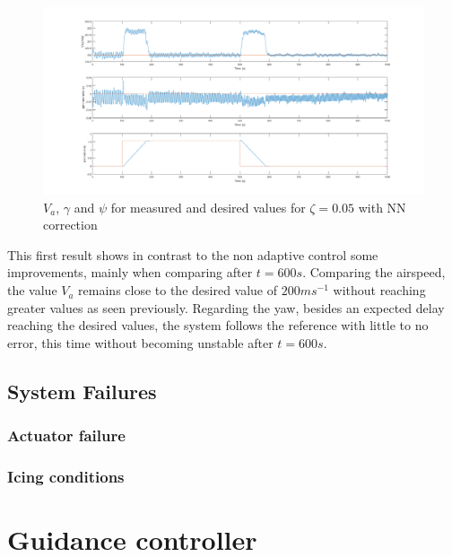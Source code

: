 \begin{figure}[H]
\centering
\includegraphics[width=\textwidth]{Figures/Results/ref_zeta_005_NN.png}
\caption[Reference tracking for $\zeta=0.05$ with NN correction]{$V_a$, $\gamma$ and $\psi$ for measured and desired values for $\zeta=0.05$ with NN correction}
\label{fig:ref_zeta_005_NN}
\end{figure}

This first result shows in contrast to the non adaptive control some improvements, mainly when comparing after $t=600s$. Comparing the airspeed, the value $V_a$ remains close to the desired value of $200ms^{-1}$ without reaching greater values as seen previously. Regarding the yaw, besides an expected delay reaching the desired values, the system follows the reference with little to no error, this time without becoming unstable after $t=600s$.

\subsection{System Failures}

\subsubsection{Actuator failure}

\subsubsection{Icing conditions}

\section{Guidance controller}
\label{section:results/guidance_control}


